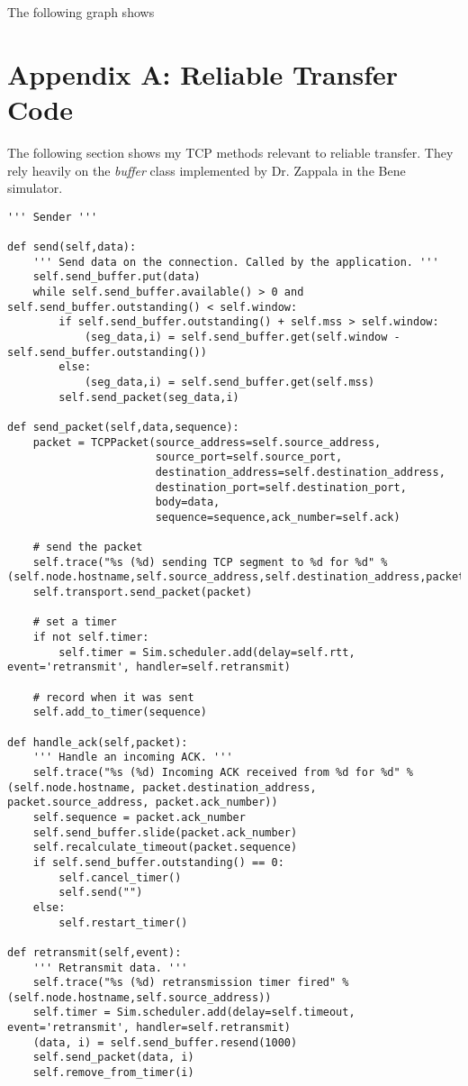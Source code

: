\documentclass[11pt]{article}
\begin{document}
The following graph shows 

\section{Appendix A: Reliable Transfer Code}

The following section shows my TCP methods relevant to reliable transfer. They rely heavily on the \emph{buffer} class implemented by Dr. Zappala in the Bene simulator.

\vspace{5mm}
\begin{absolutelynopagebreak}
\begin{lstlisting}
''' Sender '''

def send(self,data):
    ''' Send data on the connection. Called by the application. '''
    self.send_buffer.put(data)
    while self.send_buffer.available() > 0 and self.send_buffer.outstanding() < self.window:
        if self.send_buffer.outstanding() + self.mss > self.window:
            (seg_data,i) = self.send_buffer.get(self.window - self.send_buffer.outstanding())
        else:
            (seg_data,i) = self.send_buffer.get(self.mss)
        self.send_packet(seg_data,i)

def send_packet(self,data,sequence):
    packet = TCPPacket(source_address=self.source_address,
                       source_port=self.source_port,
                       destination_address=self.destination_address,
                       destination_port=self.destination_port,
                       body=data,
                       sequence=sequence,ack_number=self.ack)

    # send the packet
    self.trace("%s (%d) sending TCP segment to %d for %d" % (self.node.hostname,self.source_address,self.destination_address,packet.sequence))
    self.transport.send_packet(packet)

    # set a timer
    if not self.timer:
        self.timer = Sim.scheduler.add(delay=self.rtt, event='retransmit', handler=self.retransmit)
    
    # record when it was sent
    self.add_to_timer(sequence)

def handle_ack(self,packet):
    ''' Handle an incoming ACK. '''
    self.trace("%s (%d) Incoming ACK received from %d for %d" % (self.node.hostname, packet.destination_address, packet.source_address, packet.ack_number))
    self.sequence = packet.ack_number
    self.send_buffer.slide(packet.ack_number)
    self.recalculate_timeout(packet.sequence)
    if self.send_buffer.outstanding() == 0:
        self.cancel_timer()
        self.send("")
    else:
        self.restart_timer()

def retransmit(self,event):
    ''' Retransmit data. '''
    self.trace("%s (%d) retransmission timer fired" % (self.node.hostname,self.source_address))
    self.timer = Sim.scheduler.add(delay=self.timeout, event='retransmit', handler=self.retransmit)
    (data, i) = self.send_buffer.resend(1000)
    self.send_packet(data, i)
    self.remove_from_timer(i)
\end{lstlisting}
\end{absolutelynopagebreak}
\end{document}
